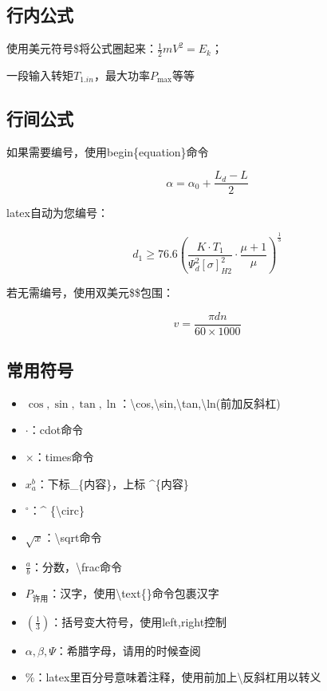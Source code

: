 \subsection{行内公式}

使用美元符号\$将公式圈起来：$\frac{1}{2}mV^2=E_k$；

一段输入转矩$T_{1.in}$，最大功率$P_{\max}$等等

\subsection{行间公式}

如果需要编号，使用begin\{equation\}命令

\begin{equation}
    \alpha=\alpha_0+\frac{L_d-L}{2}
\end{equation}

latex自动为您编号：

\begin{equation}
    d_1\geq 76.6\left( \frac{K\cdot T_1}{\Psi_d^2[\sigma]_{H2}^2}\cdot\frac{\mu+1}{\mu} \right)^{\frac{1}{3}}
\end{equation}

若无需编号，使用双美元\$\$包围：

$$
v=\frac{\pi d n}{60\times 1000}
$$

\subsection{常用符号}

\begin{itemize}
    \item $\cos,\sin,\tan,\ln$：\textbackslash cos,\textbackslash sin,\textbackslash tan,\textbackslash ln(前加反斜杠)
    \item $\cdot$：cdot命令
    \item $\times$：times命令
    \item $x_a^b$：下标\_\{内容\}，上标 \^{}\{内容\}
    \item $^{\circ}$：\^{} \{\textbackslash circ\}
    \item $\sqrt{x}$：\textbackslash sqrt命令
    \item $\frac{a}{b}$：分数，\textbackslash frac命令
    \item $P_{\text{许用}}$：汉字，使用\textbackslash text\{\}命令包裹汉字
    \item $\left( \frac{1}{3}\right)$：括号变大符号，使用left,right控制
    \item $\alpha,\beta,\Psi$：希腊字母，请用的时候查阅
    \item $\%$：latex里百分号意味着注释，使用前加上\textbackslash 反斜杠用以转义
\end{itemize}


